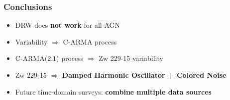 \documentclass[hyperref={pdfpagelabels=false}]{beamer}
\begin{document}

\begin{frame}
\frametitle{Conclusions}
  \begin{itemize}
    \item DRW does \textbf{not work} for all AGN
    \item Variability $\Rightarrow$ C-ARMA process
    \item C-ARMA($2$,$1$) process $\Rightarrow$ Zw 229-15 variability
    \item Zw 229-15 $\Rightarrow$ \textbf{Damped Harmonic Oscillator + Colored Noise}
    \item Future time-domain surveys: \textbf{combine multiple data sources}
  \end{itemize}
\end{frame}
\end{document}
